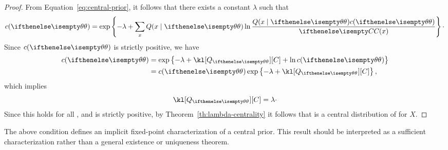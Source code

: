 \begin{proof}
    \newcommand{\cp}{\cPrior(\paramVal{})}
    From Equation~\ref{eq:central-prior}, it follows that there exists a constant $\lambda$ such that
    \begin{equation*}
        \cp = \exp \left\{-\lambda +  \sum_{x} \like(\xIt) \ln
                       \frac{\like(\xIt) \cp}{\cDist(x)} \right\} \cdot
    \end{equation*}
    Since $\cp$ is strictly positive, we have
    \begin{align*}
        \cp &= \exp \left\{-\lambda +  \kl[Q_{\paramVal{}}][C] + \ln \cp \right\} \\
        &= \cp \exp \left\{-\lambda +  \kl[Q_{\paramVal{}}][C] \right\},
    \end{align*}
    which implies
    \[
        \kl[Q_{\paramVal{}}][C] = \lambda \cdot
    \]
    Since this holds for all \paramVal, and \cPrior is strictly positive, by Theorem~\ref{th:lambda-centrality} it
    follows that \cDist is a central distribution of \setQ for $X$.
\end{proof}

The above condition defines an implicit fixed-point characterization of a central prior.
This result should be interpreted as a sufficient characterization rather than a general existence or uniqueness
theorem.
